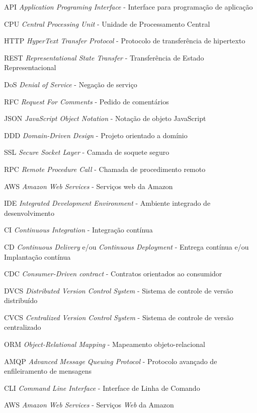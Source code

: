 
\begin{siglas}
	\item[API]{\emph{Application Programing Interface} - Interface para programação de aplicação}
	\item[CPU]{\emph{Central Processing Unit} - Unidade de Processamento Central}
	\item[HTTP]{\emph{HyperText Transfer Protocol} - Protocolo de transferência de hipertexto}
	\item[REST]{\emph{Representational State Transfer} - Transferência de Estado Representacional}
	\item[DoS]{\emph{Denial of Service} - Negação de serviço}
	\item[RFC]{\emph{Request For Comments} - Pedido de comentários}
	\item[JSON]{\emph{JavaScript Object Notation} - Notação de objeto JavaScript}
	\item[DDD]{\emph{Domain-Driven Design} - Projeto orientado a domínio}
	\item[SSL]{\emph{Secure Socket Layer} - Camada de soquete seguro}
	\item[RPC]{\emph{Remote Procedure Call} - Chamada de procedimento remoto}
	\item[AWS]{\emph{Amazon Web Services} - Serviços web da Amazon}
	\item[IDE]{\emph{Integrated Development Environment} - Ambiente integrado de desenvolvimento}
	\item[CI]{\emph{Continuous Integration} - Integração contínua}
	\item[CD]{\emph{Continuous Delivery} e/ou \emph{Continuous Deployment} - Entrega contínua e/ou Implantação contínua}
	\item[CDC]{\emph{Consumer-Driven contract} - Contratos orientados ao consumidor}
	\item[DVCS]{\emph{Distributed Version Control System} - Sistema de controle de versão distribuído}
	\item[CVCS]{\emph{Centralized Version Control System} - Sistema de controle de versão centralizado}
	\item[ORM]{\emph{Object-Relational Mapping} - Mapeamento objeto-relacional}
	\item[AMQP]{\emph{Advanced Message Queuing Protocol} - Protocolo avançado de enfileiramento de mensagens}
	\item[CLI]{\emph{Command Line Interface} - Interface de Linha de Comando}
	\item[AWS]{\emph{Amazon Web Services} - Serviços \emph{Web} da Amazon}

\end{siglas}
